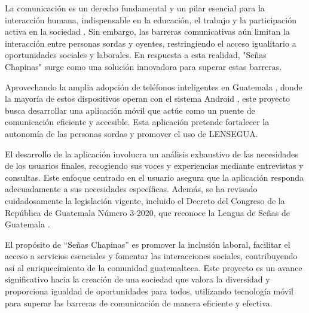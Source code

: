 La comunicación es un derecho fundamental y un pilar esencial para la interacción humana, indispensable en la educación, el trabajo y la participación activa en la sociedad \cite{NacionesUnidas2024}. Sin embargo, las barreras comunicativas aún limitan la interacción entre personas sordas y oyentes, restringiendo el acceso igualitario a oportunidades sociales y laborales. En respuesta a esta realidad, "Señas Chapinas" surge como una solución innovadora para superar estas barreras.

Aprovechando la amplia adopción de teléfonos inteligentes en Guatemala \cite{Xie2023}, donde la mayoría de estos dispositivos operan con el sistema Android \cite{Xie2023}, este proyecto busca desarrollar una aplicación móvil que actúe como un puente de comunicación eficiente y accesible. Esta aplicación pretende fortalecer la autonomía de las personas sordas y promover el uso de LENSEGUA.

El desarrollo de la aplicación involucra un análisis exhaustivo de las necesidades de los usuarios finales, recogiendo sus voces y experiencias mediante entrevistas y consultas. Este enfoque centrado en el usuario asegura que la aplicación responda adecuadamente a sus necesidades específicas. Además, se ha revisado cuidadosamente la legislación vigente, incluido el Decreto del Congreso de la República de Guatemala Número 3-2020, que reconoce la Lengua de Señas de Guatemala \cite{CongresoGuatemala2022}.

El propósito de ``Señas Chapinas'' es promover la inclusión laboral, facilitar el acceso a servicios esenciales y fomentar las interacciones sociales, contribuyendo así al enriquecimiento de la comunidad guatemalteca. Este proyecto es un avance significativo hacia la creación de una sociedad que valora la diversidad y proporciona igualdad de oportunidades para todos, utilizando tecnología móvil para superar las barreras de comunicación de manera eficiente y efectiva.
